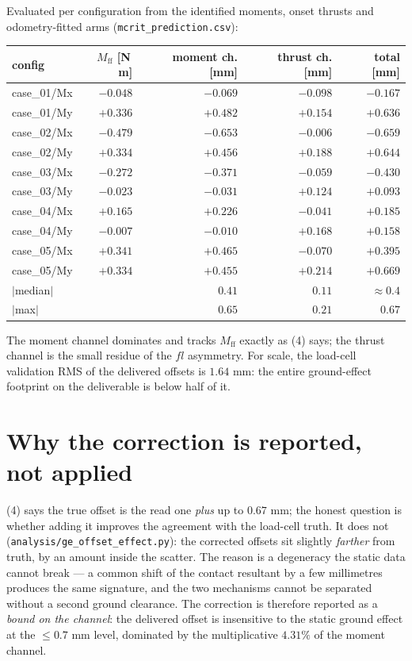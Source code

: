 \documentclass[10pt]{article}
\newcommand{\Mff}{M_{\mathrm{ff}}}
\begin{document}
Evaluated per configuration from the identified moments, onset
thrusts and odometry-fitted arms
(\texttt{mcrit\_prediction.csv}):
\begin{center}\small
\begin{tabular}{@{}l r r r r@{}}
\toprule
config & $\Mff$ [N\,m] & moment ch. [mm] & thrust ch. [mm] &
total [mm]\\
\midrule
case\_01/Mx & $-0.048$ & $-0.069$ & $-0.098$ & $-0.167$\\
case\_01/My & $+0.336$ & $+0.482$ & $+0.154$ & $+0.636$\\
case\_02/Mx & $-0.479$ & $-0.653$ & $-0.006$ & $-0.659$\\
case\_02/My & $+0.334$ & $+0.456$ & $+0.188$ & $+0.644$\\
case\_03/Mx & $-0.272$ & $-0.371$ & $-0.059$ & $-0.430$\\
case\_03/My & $-0.023$ & $-0.031$ & $+0.124$ & $+0.093$\\
case\_04/Mx & $+0.165$ & $+0.226$ & $-0.041$ & $+0.185$\\
case\_04/My & $-0.007$ & $-0.010$ & $+0.168$ & $+0.158$\\
case\_05/Mx & $+0.341$ & $+0.465$ & $-0.070$ & $+0.395$\\
case\_05/My & $+0.334$ & $+0.455$ & $+0.214$ & $+0.669$\\
\midrule
$|$median$|$ & & $0.41$ & $0.11$ & $\approx 0.4$\\
$|$max$|$    & & $0.65$ & $0.21$ & $0.67$\\
\bottomrule
\end{tabular}
\end{center}
The moment channel dominates and tracks $\Mff$ exactly as (4) says;
the thrust channel is the small residue of the $f l$ asymmetry. For
scale, the load-cell validation RMS of the delivered offsets is
$1.64$ mm: the entire ground-effect footprint on the deliverable is
below half of it.

\section{Why the correction is reported, not applied}

(4) says the true offset is the read one \emph{plus} up to
$0.67$ mm; the honest question is whether adding it improves the
agreement with the load-cell truth. It does not
(\texttt{analysis/ge\_offset\_effect.py}): the corrected offsets sit
slightly \emph{farther} from truth, by an amount inside the scatter.
The reason is a degeneracy the static data cannot break --- a
common shift of the contact resultant by a few millimetres produces
the same signature, and the two mechanisms cannot be separated
without a second ground clearance. The correction is therefore
reported as a \emph{bound on the channel}: the delivered offset is
insensitive to the static ground effect at the $\le 0.7$ mm level,
dominated by the multiplicative $4.31\%$ of the moment channel.
\end{document}
